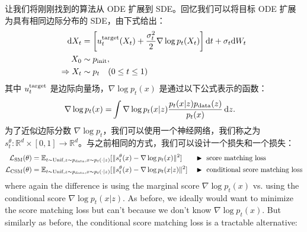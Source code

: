 让我们将刚刚找到的算法从 ODE 扩展到 SDE。回忆我们可以将目标 ODE 扩展为具有相同边际分布的 SDE，由下式给出：
\begin{align}
\label{eq:sde_extension_restated}
    \mathrm{d} X_t &=\left[u^{\text{target}}_t(X_t)+\frac{\sigma_t^2}{2}\nabla\log p_t(X_t)\right]\mathrm{d} t +\sigma_t\mathrm{d} W_t\\
    X_0&\sim p_{\rm{init}},\quad \\
    \label{eq:marginal_ode_follows_marginal_path_restated}
    \Rightarrow X_t&\sim p_t\quad (0\leq t\leq 1)
\end{align}
其中 $u^{\text{target}}_t$ 是边际向量场，$\nabla\log p_t(x)$ 是通过以下公式表示的函数：
\begin{align}
\label{eq:score_marginal_restated}
\nabla\log p_t(x) =&\int \nabla \log p_t(x|z)\frac{ p_t(x|z)p_{\rm{data}}(z)}{p_t(x)}\,\mathrm{d} z.
\end{align}
为了近似边际分数 $\nabla\log p_t$，我们可以使用一个神经网络，我们称之为 $s_t^\theta:\mathbb{R}^d\times[0,1]\to\mathbb{R}^d$。与之前相同的方式，我们可以设计一个损失和一个损失：
\begin{align*}
    \mathcal{L}_{\text{SM}}(\theta) &=\mathbb{E}_{t\sim\text{Unif},z\sim p_{\rm{data}}, x\sim p_t(\cdot|z)}[\|s_t^\theta(x) - \nabla\log p_t(x)\|^2] &&\blacktriangleright\,\,\text{score matching loss}\\
    \mathcal{L}_{\text{CSM}}(\theta) &=\mathbb{E}_{t\sim\text{Unif},z\sim p_{\rm{data}}, x\sim p_t(\cdot|z)}[\|s_t^\theta(x) - \nabla\log p_t(x|z)\|^2]  &&\blacktriangleright\,\,\text{conditional score matching loss}
\end{align*}
where again the difference is using the marginal score $\nabla\log p_t(x)$ vs. using the conditional score $\nabla\log p_t(x|z)$. %
As before, we ideally would want to minimize the score matching loss but can't because we don't know $\nabla\log p_t(x)$. But similarly as before, the conditional score matching loss is a tractable alternative:

